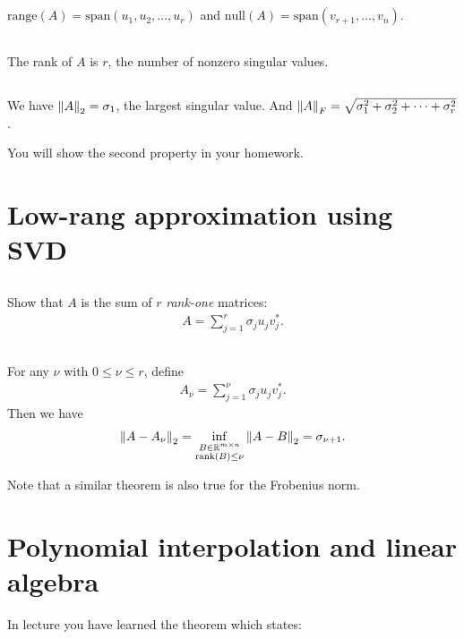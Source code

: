 \documentclass[11pt,letterpaper]{article}
\begin{document}
\subsection{}
$\text{range}(A) = \text{span}(u_1,u_2,\dots,u_r)$ and $\text{null}(A) = \text{span}(v_{r+1},\dots,v_n)$. 

\subsection{}
The rank of $A$ is $r$, the number of nonzero singular values.

\subsection{}
We have $\left\Vert A \right\Vert_2 = \sigma_1$, the largest singular value. And $\left\Vert A \right\Vert_F = \sqrt{\sigma_1^2+\sigma_2^2+\dots+\sigma_r^2}$. 

You will show the second property in your homework.

\section{Low-rang approximation using SVD}
\subsection{}
Show that $A$ is the sum of $r$ \emph{rank-one} matrices:
\begin{align*}
    A = \sum_{j=1}^r \sigma_j u_j v_j^*.
\end{align*}

\subsection{}
For any $\nu$ with $0\leq \nu \leq r$, define
\begin{align*}
    A_\nu = \sum_{j=1}^\nu \sigma_j u_j v_j^*.
\end{align*}
Then we have
\begin{align*}
    \left\Vert A-A_\nu \right\Vert_2 = \inf_{\substack{B\in\mathbb{R}^{m\times n}\\\text{rank}(B)\leq\nu}}\left\Vert A-B \right\Vert_2 = \sigma_{\nu+1}.
\end{align*}

Note that a similar theorem is also true for the Frobenius norm.

\section{Polynomial interpolation and linear algebra}
In lecture you have learned the theorem which states:
\end{document}
